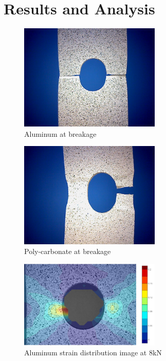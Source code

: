 \documentclass{article}
\begin{document}
\section{Results and Analysis}


\begin{figure}[H]
    \centering
    \includegraphics[width = 0.6\textwidth]{lab9images/aluminum_break.jpg}
    \caption{Aluminum at breakage}
    \label{fig:alfail}
\end{figure}

\begin{figure}[H]
    \centering
    \includegraphics[width = 0.6\textwidth]{lab9images/polycarbonate_break.jpg}
    \caption{Poly-carbonate at breakage}
    \label{fig:PCfail}
\end{figure}

\begin{figure}[H]
    \centering
    \includegraphics[width = 0.6\textwidth]{lab9images/meow color plot aluminum.PNG}
    \caption{Aluminum strain distribution image at 8kN}
    \label{fig:al8kNpic}
\end{figure}
\end{document}

